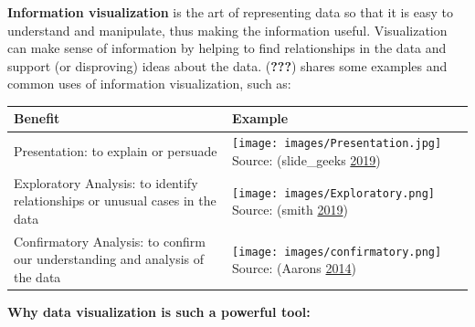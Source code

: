 \documentclass[]{book}
\begin{document}
\textbf{Information visualization} is the art of representing data so
that it is easy to understand and manipulate, thus making the
information useful. Visualization can make sense of information by
helping to find relationships in the data and support (or disproving)
ideas about the data. ({\textbf{???}}) shares some examples and common
uses of information visualization, such as:

\begin{longtable}[]{@{}ll@{}}
\toprule
\begin{minipage}[b]{0.18\columnwidth}\raggedright\strut
Benefit\strut
\end{minipage} & \begin{minipage}[b]{0.18\columnwidth}\raggedright\strut
Example\strut
\end{minipage}\tabularnewline
\midrule
\endhead
\begin{minipage}[t]{0.18\columnwidth}\raggedright\strut
Presentation: to explain or persuade\strut
\end{minipage} & \begin{minipage}[t]{0.18\columnwidth}\raggedright\strut
\texttt{[image: images/Presentation.jpg]} Source: (slide\_geeks
\protect\hyperlink{ref-slide_geeks}{2019})\strut
\end{minipage}\tabularnewline
\begin{minipage}[t]{0.18\columnwidth}\raggedright\strut
Exploratory Analysis: to identify relationships or unusual cases in the
data\strut
\end{minipage} & \begin{minipage}[t]{0.18\columnwidth}\raggedright\strut
\texttt{[image: images/Exploratory.png]} Source: (smith
\protect\hyperlink{ref-david_2019}{2019})\strut
\end{minipage}\tabularnewline
\begin{minipage}[t]{0.18\columnwidth}\raggedright\strut
Confirmatory Analysis: to confirm our understanding and analysis of the
data\strut
\end{minipage} & \begin{minipage}[t]{0.18\columnwidth}\raggedright\strut
\texttt{[image: images/confirmatory.png]} Source: (Aarons
\protect\hyperlink{ref-aarons_2014}{2014})\strut
\end{minipage}\tabularnewline
\bottomrule
\end{longtable}

\textbf{Why data visualization is such a powerful tool:}
\end{document}

